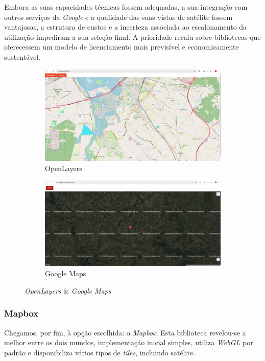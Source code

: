 Embora as suas capacidades técnicas fossem adequadas, a sua integração com outros serviços da \textit{Google} e a qualidade das suas vistas de satélite fossem vantajosas, a estrutura de custos e a incerteza associada ao escalonamento da utilização impediram a sua seleção final. A prioridade recaiu sobre bibliotecas que oferecessem um modelo de licenciamento mais previsível e economicamente sustentável.

\begin{figure}[!h]
	\centering
	\begin{subfigure}[c]{0.45\textwidth}
	\centering
	\includegraphics[width=\textwidth]{figs/ol.png}
	\caption{OpenLayers}
	\label{fig:ol}
	\end{subfigure}
	\hfill
	\begin{subfigure}[c]{0.45\textwidth}
		\centering
		\includegraphics[width=\textwidth]{figs/gm.png}
		\caption{Google Maps}
		\label{fig:gm}
	\end{subfigure}
	\caption{\textit{OpenLayers} \& \textit{Google Maps}}
    \label{fig:1}
\end{figure}

\clearpage
\subsubsection{\textbf{Mapbox}}\label{sec:mapbox} %
Chegamos, por fim, à opção escolhida: o \textit{Mapbox}. Esta biblioteca revelou-se a melhor entre os dois mundos, implementação inicial simples, utiliza \textit{WebGL} por padrão e disponibiliza vários tipos de \textit{tiles}, incluindo satélite. 

